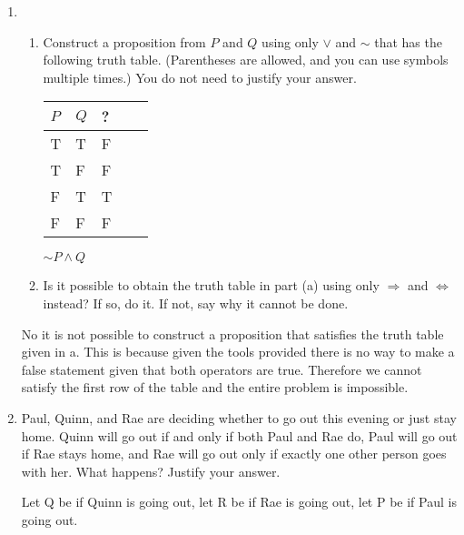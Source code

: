 \documentclass{article}
\begin{document}
\begin{enumerate}[labelindent=0pt,leftmargin=0pt]
\vspace{25pt}

    \item \begin{enumerate} \item Construct a proposition from $P$ and $Q$
using only $\lor$ and $\sim$ that has the following truth table.
(Parentheses are allowed, and you can use symbols multiple times.) You do
not need to justify your answer.

    \begin{center}
    \begin{flushtable}
    \renewcommand{\arraystretch}{1.2}
    \centering
    \begin{tabular}{|l|l|l|ll}
    \hline
    $P$ & $Q$ & ? \\ \hline
    T & T & F\\
    T & F & F\\
    F & T & T\\
    F & F & F\\ \hline
    
    \end{tabular}
    \end{flushtable}
    \end{center}

    \subitem $\sim\!P \land Q$
    \vspace{5pt}
    
\item Is it possible to obtain the truth table in part (a) using only
$\Rightarrow$ and $\Leftrightarrow$ instead? If so, do it. If not, say why
it cannot be done.
\end{enumerate}

No it is not possible to construct a proposition that satisfies the truth table given in a. This is because given the tools provided there is no way to make a false statement given that both operators are true. Therefore we cannot satisfy the first row of the table and the entire problem is impossible. 


\item Paul, Quinn, and Rae are deciding whether to go out this evening
or just stay home. Quinn will go out if and only if both Paul and Rae do,
Paul will go out if Rae stays home, and Rae will go out only if exactly
one other person goes with her. What happens? Justify your answer.

\subitem Let Q be if Quinn is going out, let R be if Rae is going out, let P be if Paul is going out.


\end{enumerate}
\end{document}
